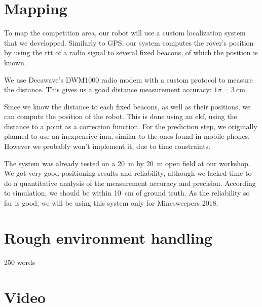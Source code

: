 \section{Mapping}

To map the competition area, our robot will use a custom localization system that we developped.
Similarly to GPS, our system computes the rover's position by using the \gls{rtt} of a radio signal to several fixed beacons, of which the position is known.

We use Decawave's DWM1000 radio modem with a custom protocol to measure the distance.
This gives us a good distance measurement accuracy: $1 \sigma = \SI{3}{\centi\meter}$.

Since we know the distance to each fixed beacons, as well as their positions, we can compute the position of the robot.
This is done using an \gls{ekf}, using the distance to a point as a correction function.
For the prediction step, we originally planned to use an inexpensive \gls{imu}, similar to the ones found in mobile phones.
However we probably won't implement it, due to time constraints.

The system was already tested on a \SI{20}{\meter} by \SI{20}{\meter} open field at our workshop.
We got very good positioning results and reliability, although we lacked time to do a quantitative analysis of the measurement accuracy and precision.
According to simulation, we should be within \SI{10}{\centi\meter} of ground truth.
As the reliability so far is good, we will be using this system only for Minesweepers 2018.


\section{Rough environment handling}

250 words

\section{Video}
